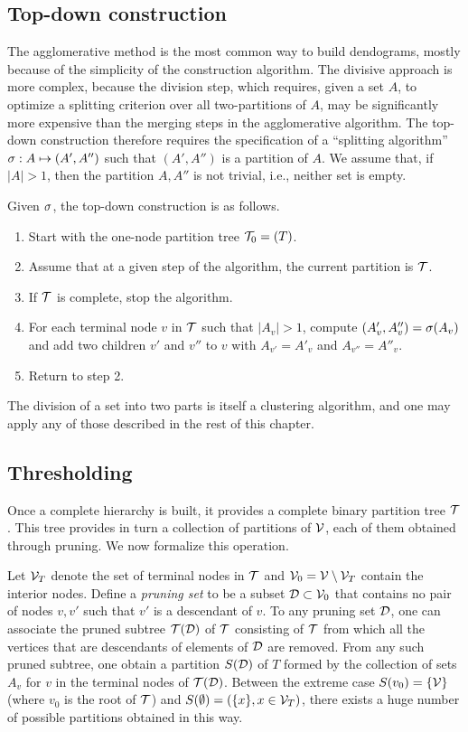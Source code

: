 \subsection{Top-down construction}

The agglomerative method is the most common way to build dendograms, mostly because of the simplicity of the construction algorithm. The divisive approach is more complex, because the division step, which  requires, given a set $A$, to optimize a splitting criterion over all two-partitions of $A$, may be significantly more expensive than the merging steps in the agglomerative algorithm. 
The top-down construction therefore requires the specification of a ``splitting algorithm'' $\sigma: A \mapsto (A', A'')$ such that $(A', A'')$ is a partition of $A$.  We assume that, if $|A|>1$, then the partition $A,A''$ is not trivial, i.e., neither set is empty.

Given $\sigma$, the top-down construction is as follows. 
\begin{algorithm}
\label{alg:hierarchical.tdown}
\begin{enumerate}[label=\arabic*., wide=0.5cm]
\item  Start with the one-node partition tree   ${\mathcal T}_0= (T)$.
\item Assume that at a given step of the algorithm, the current partition is  ${\mathcal T}$.
\item If ${\mathcal T}$ is complete, stop the algorithm.
\item For each terminal node $v$ in ${\mathcal T}$ such that $|A_v| > 1$, compute $(A'_v, A''_v) = \sigma(A_v)$ and add two children $v'$ and $v''$ to $v$ with $A_{v'} = A'_v$ and $A_{v''} = A''_v$.
\item Return to step 2.
\end{enumerate}
\end{algorithm}
The division of a set into two parts is itself a clustering algorithm, and one may apply any of those described in the rest of this chapter.


\subsection{Thresholding}
Once a complete hierarchy is built, it provides a complete binary partition tree ${\mathcal T}$. This tree provides in turn a collection of partitions of ${\mathcal V}$, each of them obtained through pruning. We now formalize this operation.

Let ${\mathcal V}_T$ denote the set of terminal nodes in ${\mathcal T}$ and ${\mathcal V}_0 = {\mathcal V} \setminus {\mathcal V}_T$ contain the interior nodes. Define a {\em pruning set} to be a subset  ${\mathcal D}\subset {\mathcal V}_0 $ that contains no pair of nodes $v,v'$ such that $v'$ is a descendant of $v$. To any pruning set ${\mathcal D}$,  one can associate the pruned subtree ${\mathcal T}({\mathcal D})$ of ${\mathcal T}$ consisting of ${\mathcal T}$ from which  all the vertices that are descendants of elements of ${\mathcal D}$ are removed. From any such pruned subtree, one obtain a partition $S({\mathcal D})$ of $T$ formed by the collection of sets $A_v$ for $v$ in the terminal nodes of ${\mathcal T}({\mathcal D})$. Between the extreme case $S(v_0) = \{{\mathcal V}\}$ (where $v_0$ is the root of ${\mathcal T}$) and $S(\emptyset) = (\{x\}, x\in {\mathcal V}_T)$, there exists a huge number of possible partitions obtained in this way.

